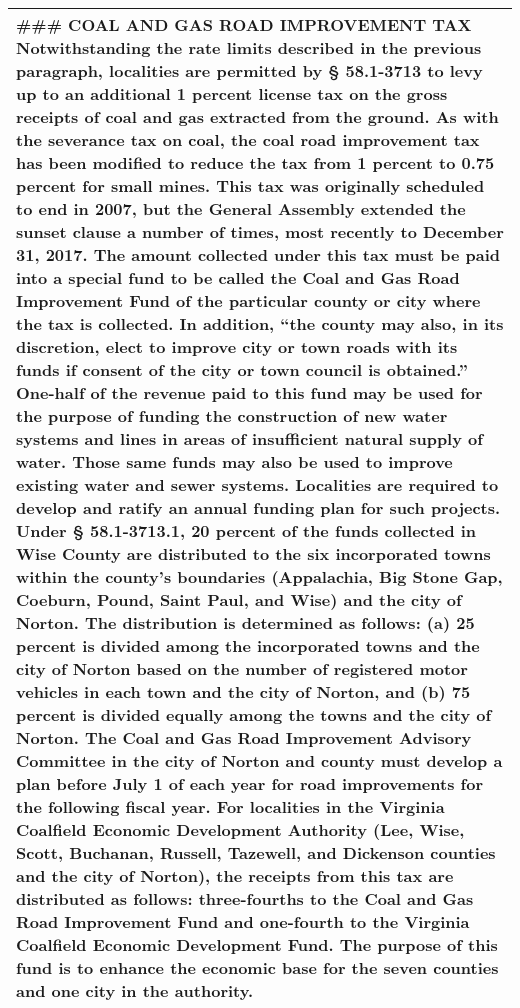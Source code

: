 \documentclass[
]{book}
\begin{document}
\begin{longtable}[]{@{}
  >{\raggedright\arraybackslash}p{}@{}}
\textbar{}
\#\#\# COAL AND GAS ROAD IMPROVEMENT TAX
\textbar{} Notwithstanding the rate limits described in the previous paragraph, localities are permitted by § 58.1-3713 to levy up to an additional 1 percent license tax on the gross receipts of coal and gas extracted from the ground. As with the severance tax on coal, the coal road improvement tax has been modified to reduce the tax from 1 percent to 0.75 percent for small mines. This tax was originally scheduled to end in 2007, but the General Assembly extended the sunset clause a number of times, most recently to December 31, 2017.
\textbar{}
\textbar{} The amount collected under this tax must be paid into a special fund to be called the Coal and Gas Road Improvement Fund of the particular county or city where the tax is collected. In addition, ``the county may also, in its discretion, elect to improve city or town roads with its funds if consent of the city or town council is obtained.'' One-half of the revenue paid to this fund may be used for the purpose of funding the construction of new water systems and lines in areas of insufficient natural supply of water. Those same funds may also be used to improve existing water and sewer systems. Localities are required to develop and ratify an annual funding plan for such projects. Under § 58.1-3713.1, 20 percent of the funds collected in Wise County are distributed to the six incorporated towns within the county's boundaries (Appalachia, Big Stone Gap, Coeburn, Pound, Saint Paul, and Wise) and the city of Norton. The distribution is determined as follows: (a) 25 percent is divided among the incorporated towns and the city of Norton based on the number of registered motor vehicles in each town and the city of Norton, and (b) 75 percent is divided equally among the towns and the city of Norton. The Coal and Gas Road Improvement Advisory Committee in the city of Norton and county must develop a plan before July 1 of each year for road improvements for the following fiscal year. For localities in the Virginia Coalfield Economic Development Authority (Lee, Wise, Scott, Buchanan, Russell, Tazewell, and Dickenson counties and the city of Norton), the receipts from this tax are distributed as follows: three-fourths to the Coal and Gas Road Improvement Fund and one-fourth to the Virginia Coalfield Economic Development Fund. The purpose of this fund is to enhance the economic base for the seven counties and one city in the authority. \\
\bottomrule
\end{longtable}
\end{document}
